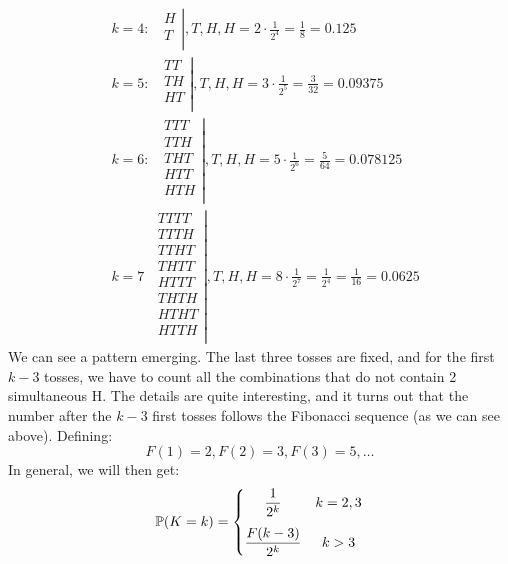 \newpage\noindent
\begin{align*}
    &k=4:\;\;
    \left.
    \begin{matrix} 
        H \\ 
        T \\ 
    \end{matrix}
    \right|,T, H, H
    = 2\cdot \frac{1}{2^4} = \frac{1}{8} = 0.125\\
    &k=5:\;\;
    \left.
    \begin{matrix} 
        TT \\ 
        TH \\ 
        HT \\ 
    \end{matrix}
    \right|,T, H, H
    = 3\cdot \frac{1}{2^5} = \frac{3}{32} = 0.09375\\
    &k=6:\;\;
    \left.
    \begin{matrix} 
        TTT \\ 
        TTH \\ 
        THT \\ 
        HTT \\ 
        HTH \\ 
    \end{matrix}
    \right|,T, H, H
    = 5\cdot \frac{1}{2^6} = \frac{5}{64} = 0.078125 \\
    &k=7\;\;
    \left.
    \begin{matrix} 
        TTTT \\ 
        TTTH \\ 
        TTHT \\ 
        THTT \\ 
        HTTT \\ 
        THTH \\ 
        HTHT \\ 
        HTTH \\ 
    \end{matrix}
    \right|,T, H, H
    = 8\cdot \frac{1}{2^7} = \frac{1}{2^4} = \frac{1}{16} = 0.0625
\end{align*}
We can see a pattern emerging. The last three tosses are fixed, and for the first $k-3$ tosses, we have to count
all the combinations that do not contain 2 simultaneous H. The details are quite interesting, and it turns out
that the number after the $k-3$ first tosses follows the Fibonacci sequence (as we can see above). Defining:
$$
F(1) = 2, F(2) = 3, F(3) = 5, \ldots
$$
In general, we will then get:
$$
\P(K=k) =
\left\{
    \begin{matrix}
        \displaystyle\frac{1}{2^k} & k = 2,3 \\
        \rule{0pt}{22pt}\displaystyle\frac{F(k-3)}{2^k} & k > 3
    \end{matrix}
\right.
$$

